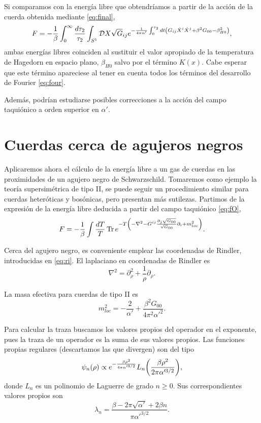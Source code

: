 Si comparamos con la energía libre que obtendríamos a partir de la acción de la cuerda obtenida
mediante \ref{eq:final},
\begin{equation}
  F=-\frac{1}{\beta} \int_0^\infty \frac{d\tau_2}{\tau_2} \int_{S^1} \mathcal D X\sqrt G_{ij}  e^{ -\frac{1}{4\pi\alpha'}\int_0^{\tau_2} dt \qty(  
  G_{ij}\dot X^i \dot X^j  + \beta^2 G_{00} - \beta^2_{H0})},
\end{equation}
ambas energías libres coinciden al sustituir el valor apropiado de la temperatura de Hagedorn
en espacio plano, $\beta_{H0}$ salvo por el término $K(x)$. 
Cabe esperar que este término apareciese al tener en cuenta todos los términos del desarrollo de 
Fourier \ref{eq:four}.

Además, podrían estudiarse posibles correcciones a la acción del campo taquiónico a orden superior en $\alpha'$.

\section{Cuerdas cerca de agujeros negros}

Aplicaremos ahora el cálculo de la energía libre a un gas de cuerdas en las proximidades
de un agujero negro de Schwarzschild. 
Tomaremos como ejemplo la teoría supersimétrica de tipo II, se puede seguir un procedimiento
similar para cuerdas heteróticas y bosónicas, pero presentan más sutilezas.
Partimos de la expresión de la energía libre deducida a partir del campo taquiónico \ref{eq:fO},
\begin{equation}
  F=-\frac{1}{\beta}\int \frac{dT}{T} \Tr e^{-T\qty(  -\nabla^2-G^{ij}\frac{\partial_j \sqrt{G_{00}}}{\sqrt G_{00}}\partial_i + m^2_{loc}) }.
\end{equation}

Cerca del agujero negro, es conveniente emplear las coordenadas de Rindler, introducidas en \ref{eq:ri}.
El laplaciano en coordenadas de Rindler es
\begin{equation}
  \nabla^2  = \partial_\rho^2 + \frac{1}{\rho}\partial_\rho.
\end{equation}

La masa efectiva para cuerdas de tipo II es 
\begin{equation}
  m_{loc}^2=-\frac{2}{\alpha'}+\frac{\beta^2G_{00}}{4\pi^2\alpha'^2}.
\end{equation}

Para calcular la traza buscamos los valores propios del operador en el exponente,
pues la traza de un operador es la suma de sus valores propios.
Las funciones propias regulares (descartamos las que divergen) son del tipo
\begin{equation}
  \psi_n(\rho)\propto e^{-\frac{\beta \rho^2}{4\pi\alpha'^{3/2}} }
  L_n\qty(\frac{\beta\rho^2}{2\pi\alpha'^{3/2}}),
\end{equation}
donde $L_n$ es un polinomio de Laguerre de grado $n\geq0$.
Sus correspondientes valores propios son
\begin{equation}
  \lambda_n=\frac{\beta-2\pi\sqrt{\alpha'}+2\beta n }{\pi\alpha'^{3/2}}.
\end{equation}

